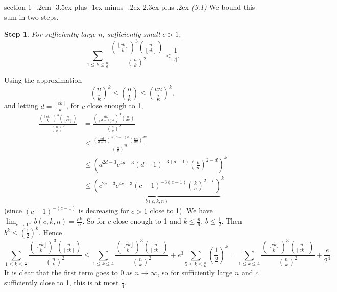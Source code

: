 \documentclass[12pt]{article}
\makeatletter
\theoremstyle{norm}
\newtheorem{st}{Step}
\newcommand{\rc}[1]{\frac{1}{#1}}
\newcommand{\pa}[1]{\left( {#1} \right)}
\newcommand{\fl}[1]{\left\lfloor {#1}\right\rfloor}
\newcommand{\pf}[2]{\pa{\frac{#1}{#2}}}
\newcommand{\prc}[1]{\pa{\rc{#1}}}
\newcommand{\iy}[0]{\infty}
\newenvironment{problem}{\@startsection
       {section}
       {1}
       {-.2em}
       {-3.5ex plus -1ex minus -.2ex}
       {2.3ex plus .2ex}
       {\pagebreak[3]%
       \large\bf\noindent{Problem }
       }
       }
       {%
       }
\makeatother
\begin{document}
\begin{problem}{\it(9.1)}
We bound this sum in two steps.
\begin{st}
For sufficiently large $n$, sufficiently small $c>1$,
\[
\sum_{1\le k\le\frac n{6}}\frac{\binom{\fl{ck}}{k}^3\binom{n}{\fl{ck}}}{\binom nk^2}< \rc 4.
\]
\end{st}
Using the approximation
\[
\pf nk^k\le \binom nk\le \pf {en}k^k,
\]
and letting $d=\frac{\fl{ck}}k$, for $c$ close enough to 1,
\begin{align*}
\frac{\binom{\fl{ck}}{k}^3\binom{n}{\fl{ck}}}{\binom nk^2}
&=\frac{\binom{dk}{(d-1)k}^3\binom{n}{dk}}{\binom nk^2}\\
&\le \frac{\pf{ed}{d-1}^{3(d-1)k}\pf{en}{dk}^{dk}}{\pf nk^{2k}}\\
&\le \pa{d^{2d-3} e^{4d-3} (d-1)^{-3(d-1)} \pf kn^{2-d}}^k\\
&\le{\underbrace{\pa{c^{2c-3} e^{4c-3} (c-1)^{-3(c-1)} \pf kn^{2-c}}}_{b(c,k,n)} }^k
\end{align*}
(since $(c-1)^{-(c-1)}$ is decreasing for $c>1$ close to 1). We have $\lim_{c\to 1^+} b(c,k,n)=\frac{ek}{n}$. 
So for $c$ close enough to 1 and $k\le \frac n{6}$, $b\le \rc2$. 
Then $b^k\le \prc 2^k$. Hence
\[
\sum_{1\le k\le \frac n{6}} \frac{\binom{\fl{ck}}{k}^3\binom{n}{\fl{ck}}}{\binom nk^2}
\le \sum_{1\le k\le 4}\frac{\binom{\fl{ck}}{k}^3\binom{n}{\fl{ck}}}{\binom nk^2}+e^3\sum_{5\le k\le \frac n6} \prc 2^k
=\sum_{1\le k\le 4}\frac{\binom{\fl{ck}}{k}^3\binom{n}{\fl{ck}}}{\binom nk^2}+\frac{e}{2^4}.
\]
It is clear that the first term goes to 0 as $n\to \iy$, so for sufficiently large $n$ and $c$ sufficiently close to 1, this is at most $\rc 4$. %


\end{problem}
\end{document}
